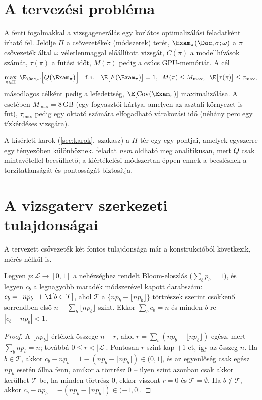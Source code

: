 \section{A tervezési probléma}

A fenti fogalmakkal a vizsgagenerálás egy korlátos optimalizálási feladatként írható fel. Jelölje
$\Pi$ a csővezetékek (módszerek) terét, $\Exam_\pi(\Doc,\sigma;\omega)$ a $\pi$ csővezeték által
$\omega$ véletlenmaggal előállított vizsgát, $C(\pi)$ a modellhívások számát, $\tau(\pi)$ a futási időt,
$M(\pi)$ pedig a csúcs GPU-memóriát. A cél
\begin{equation}
\max_{\pi\in\Pi}\;\E_{\Doc,\omega}\Bigl[Q\bigl(\Exam_\pi\bigr)\Bigr]
\quad\text{f.h.}\quad
\E\bigl[F(\Exam_\pi)\bigr]=1,\;\;
M(\pi)\le M_{\max},\;\;
\E\bigl[\tau(\pi)\bigr]\le\tau_{\max},
\label{eq:objective}
\end{equation}
másodlagos célként pedig a lefedettség, $\E[\mathrm{Cov}(\Exam_\pi)]$ maximalizálása. A \Mimir{}
esetében $M_{\max}=8$\,GB (egy fogyasztói kártya, amelyen az asztali környezet is fut), $\tau_{\max}$ pedig
egy oktató számára elfogadható várakozási idő (néhány perc egy tízkérdéses vizsgára).

A kísérleti karok (\ref{sec:karok}.~szakasz) a $\Pi$ tér egy-egy pontjai, amelyek egyszerre egy
tényezőben különböznek. \Az{\eqref{eq:objective}} feladat \emph{nem} oldható meg analitikusan, mert $Q$
csak mintavétellel becsülhető; a kiértékelési módszertan éppen ennek a becslésnek a torzítatlanságát és
pontosságát biztosítja.

\section{A vizsgaterv szerkezeti tulajdonságai}
\label{sec:terv-tulajdonsagok}

A tervezett csővezeték két fontos tulajdonsága már a konstrukcióból következik, mérés nélkül is.

\begin{allitas}\label{all:kvota}
Legyen $p:\mathcal{L}\to[0,1]$ a nehézséghez rendelt Bloom-eloszlás ($\sum_b p_b=1$), és legyen $c_b$ a
legnagyobb maradék módszerével kapott darabszám: $c_b=\lfloor np_b\rfloor+\1[b\in\mathcal{T}]$, ahol
$\mathcal{T}$ a $\{np_b-\lfloor np_b\rfloor\}$ törtrészek szerint csökkenő sorrendben első
$n-\sum_b\lfloor np_b\rfloor$ szint. Ekkor $\sum_b c_b=n$ és minden $b$-re $|c_b-np_b|<1$.
\end{allitas}

\begin{proof}
A $\lfloor np_b\rfloor$ értékek összege $n-r$, ahol $r=\sum_b(np_b-\lfloor np_b\rfloor)$ egész, mert
$\sum_b np_b=n$; továbbá $0\le r<|\mathcal{L}|$. Pontosan $r$ szint kap $+1$-et, így az összeg $n$.
Ha $b\in\mathcal{T}$, akkor $c_b-np_b=1-(np_b-\lfloor np_b\rfloor)\in(0,1]$, és az egyenlőség csak
egész $np_b$ esetén állna fenn, amikor a törtrész $0$ -- ilyen szint azonban csak akkor kerülhet
$\mathcal{T}$-be, ha minden törtrész $0$, ekkor viszont $r=0$ és $\mathcal{T}=\emptyset$. Ha
$b\notin\mathcal{T}$, akkor $c_b-np_b=-(np_b-\lfloor np_b\rfloor)\in(-1,0]$.
\end{proof}

